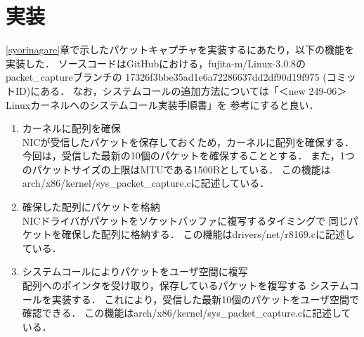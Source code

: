 \documentclass[12pt]{jsarticle}
\begin{document}
\section{実装}
\ref{syorinagare}章で示したパケットキャプチャを実装するにあたり，以下の機能を実装した．
ソースコードは\mbox{GitHub}における，\mbox{fujita-m/Linux-3.0.8}の\mbox{packet\_capture}ブランチの
17326f3bbe35ad1e6a72286637d\newline d2df90d19f975 (コミットID)にある．
なお，システムコールの追加方法については「＜new 249-06＞Linuxカーネルへのシステムコール実装手順書」を
参考にすると良い．
\begin{enumerate}
    \item カーネルに配列を確保\\
        NICが受信したパケットを保存しておくため，カーネルに配列を確保する．
        今回は，受信した最新の10個のパケットを確保することとする．
        また，1つのパケットサイズの上限はMTUである1500Bとしている．
        この機能はarch/x86/kernel/sys\_packet\_capture.cに記述している．
    \item 確保した配列にパケットを格納\\
        NICドライバがパケットをソケットバッファに複写するタイミングで
        同じパケットを確保した配列に格納する．
        この機能はdrivers/net/r8169.cに記述している．
    \item システムコールによりパケットをユーザ空間に複写\\
        配列へのポインタを受け取り，保存しているパケットを複写する
        システムコールを実装する．
        これにより，受信した最新10個のパケットをユーザ空間で確認できる．
        この機能はarch/x86/kernel/sys\_packet\_capture.cに記述している．
\end{enumerate}
\end{document}

